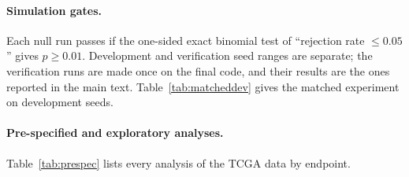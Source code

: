 \paragraph{Simulation gates.} Each null run passes if the one-sided exact binomial test of ``rejection rate $\le0.05$'' gives $p\ge0.01$. Development and verification seed ranges are separate; the verification runs are made once on the final code, and their results are the ones reported in the main text. Table~\ref{tab:matcheddev} gives the matched experiment on development seeds.

\begin{table}[H]
\centering\small
\caption{Matched cycle--module experiment on development seeds (\devdecOneN{} data sets per size); columns as in Table~\ref{tab:matched}.}
\label{tab:matcheddev}
{\footnotesize\setlength{\tabcolsep}{4pt}}
\end{table}

\paragraph{Pre-specified and exploratory analyses.} Table~\ref{tab:prespec} lists every analysis of the TCGA data by endpoint.

